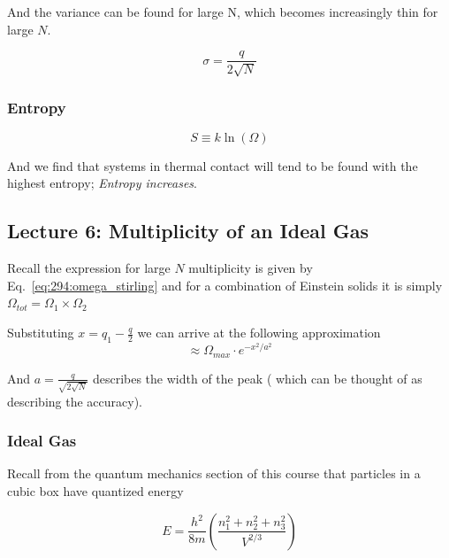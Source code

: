 \documentclass[10pt]{article}
\begin{document}
And the variance can be found for large N, which becomes increasingly thin for large $ N $.

\begin{equation}
	\sigma = \frac{q}{2\sqrt{N} }
\end{equation}



\subsubsection{Entropy}

\begin{definition}
	\begin{equation}
		S \equiv k \ln(\Omega)
		\label{eq:294:entropy}
	\end{equation}
\end{definition}

And we find that systems in thermal contact will tend to be found with the highest entropy; \textit{Entropy increases}. 





\subsection{Lecture 6: Multiplicity of an Ideal Gas}


Recall the expression for large $ N $  multiplicity is given by Eq.~\ref{eq:294:omega_stirling} and for a combination of Einstein solids it is simply $ \Omega_{tot} = \Omega_{1} \times \Omega_{2}$ 

Substituting $ x = q_1 - \frac{q}{2}  $ we can arrive at the following approximation
\begin{equation}
  \approx \Omega_{max} \cdot e ^{ -x^2 / a^2}
\end{equation}

And $ a = \frac{q}{\sqrt{2\sqrt{N} } }  $ describes the width of the peak ( which can be thought of as describing the accuracy).



\subsubsection{Ideal Gas}

\begin{blockquote}
	Recall from the quantum mechanics section of this course that particles in a cubic box have quantized energy

	\begin{equation}
		E = \frac{h^2}{8m}\left(\frac{n_1^2 + n_2^2 + n_3^2}{V^{2/3}}\right)
	\end{equation}

	
\end{blockquote}
\end{document}
